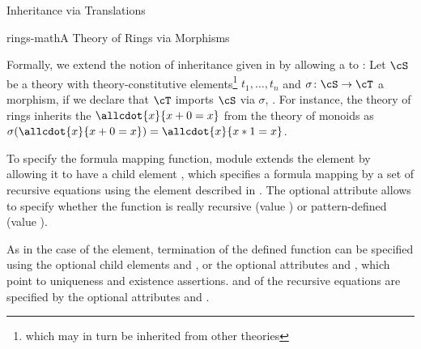 \begin{omgroup}[id=complex-theories,short=Complex Theories,
                            creators=miko,contributors=frabe]
\begin{omgroup}[id=morphisms]{Inheritance via Translations}
\begin{module}[id=morphisms]
\begin{myfig}{rings-math}{A Theory of Rings via Morphisms}
\end{myfig}

\begin{omtext}
  Formally, we extend the notion of inheritance given in  by
  allowing a {} to : Let $\cS$ be a theory with
  theory-constitutive elements\footnote{which may in turn be inherited from other
    theories} $t_1,\ldots,t_n$ and $\sigma\colon\cS\to\cT$ a morphism, if we declare that
  $\cT$ imports $\cS$ via $\sigma$, . For instance, the theory of
  rings inherits the {} $\allcdot{x}{x+0=x}$ from the theory of monoids as
  $\sigma(\allcdot{x}{x+0=x})=\allcdot{x}{x*1=x}$.
\end{omtext}

\begin{definition}[id=morphism.def]
  To specify the formula mapping function, module {} extends the
   element by allowing it to have a child element {},
  which specifies a formula mapping by a set of recursive equations using the
   element described in . The optional attribute
   allows to specify whether the function is really recursive
  (value ) or pattern-defined (value
  ).
\end{definition}

As in the case of the  element, termination of the defined function
can be specified using the optional child elements  and
, or the optional attributes  and
, which point to uniqueness and existence
assertions. {} and {} of the
recursive equations are specified by the optional attributes
 and .


\end{module}
\end{omgroup}
\end{omgroup}
